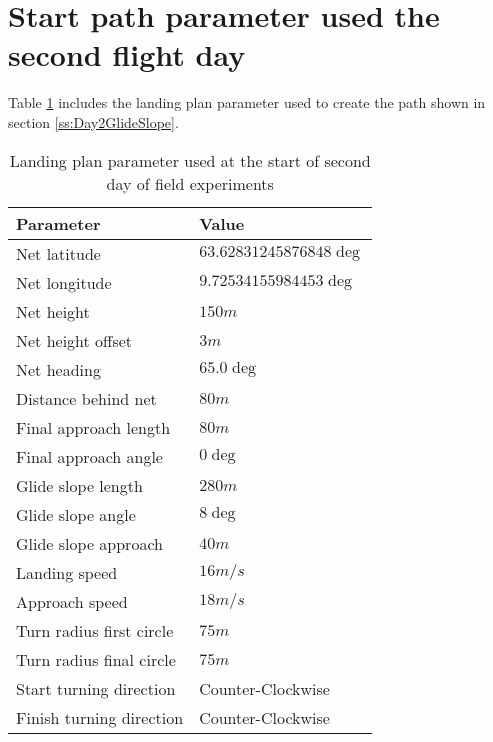 \section{Start path parameter used the second flight day}\label{AP:SpecDay2}
Table \ref{AP:TB:landingDay2} includes the landing plan parameter used to create the path shown in section \ref{ss:Day2GlideSlope}.
\begin{table}[H]
\centering
\begin{tabular}{| p{4cm} | p{4cm} |}
\hline
\textbf{Parameter}			& \textbf{Value}			\\ \hline
Net latitude				& $63.62831245876848 \deg$ 	\\ \hline
Net longitude				& $9.72534155984453 \deg$ 	\\ \hline
Net height					& $150 m$					\\ \hline
Net height offset			& $3 m$ 	\\ \hline
Net heading					& $65.0 \deg$				\\ \hline
Distance behind net			& $80 m$					\\ \hline
Final approach length		& $80 m$					\\ \hline
Final approach angle		& $0 \deg$					\\ \hline
Glide slope length			& $280 m $					\\ \hline
Glide slope angle			& $8 \deg$					\\ \hline
Glide slope approach		& $40 m$					\\ \hline
Landing speed				& $16 m/s$					\\ \hline
Approach speed				& $18 m/s$					\\ \hline
Turn radius first circle	& $75 m$					\\ \hline
Turn radius final circle	& $75 m$					\\ \hline
Start turning direction		& Counter-Clockwise			\\ \hline
Finish turning direction	& Counter-Clockwise			\\ \hline
\end{tabular}
\caption{Landing plan parameter used at the start of second day of field experiments}
\label{AP:TB:landingDay2}
\end{table}
